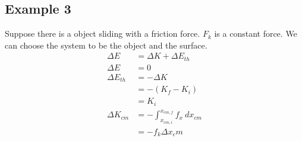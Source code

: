 \documentclass{article}
\theoremstyle{mytheoremstyle}
\theoremstyle{mytheoremstyle}
\theoremstyle{myproblemstyle}
\begin{document}
    \subsection*{Example 3}
    Suppose there is a object sliding with a friction force. $F_k$ is a constant
    force. We can choose the system to be the object and the surface.
    \begin{align*}
        \Delta E &= \Delta K + \Delta E_{th} \\
        \Delta E &= 0 \\
        \Delta E_{th} &= -\Delta K \\
        &= -(K_f - K_i) \\
        &= K_i \\
        \Delta K_{cm} &= - \int_{x_{cm,i}}^{x_{cm,f}} f_x \ dx_{cm} \\
                      &= -f_k\Delta x_cm
    \end{align*}
\end{document}
